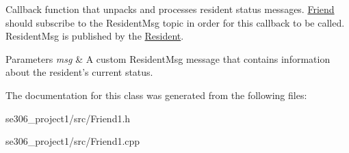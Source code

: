 Callback function that unpacks and processes resident status messages. \hyperlink{classFriend}{Friend} should subscribe to the Resident\-Msg topic in order for this callback to be called. Resident\-Msg is published by the \hyperlink{classResident}{Resident}. 


\begin{DoxyParams}{Parameters}
{\em msg} & A custom Resident\-Msg message that contains information about the resident's current status. \\
\hline
\end{DoxyParams}


The documentation for this class was generated from the following files\-:\begin{DoxyCompactItemize}
\item 
se306\-\_\-project1/src/Friend1.\-h\item 
se306\-\_\-project1/src/Friend1.\-cpp\end{DoxyCompactItemize}
